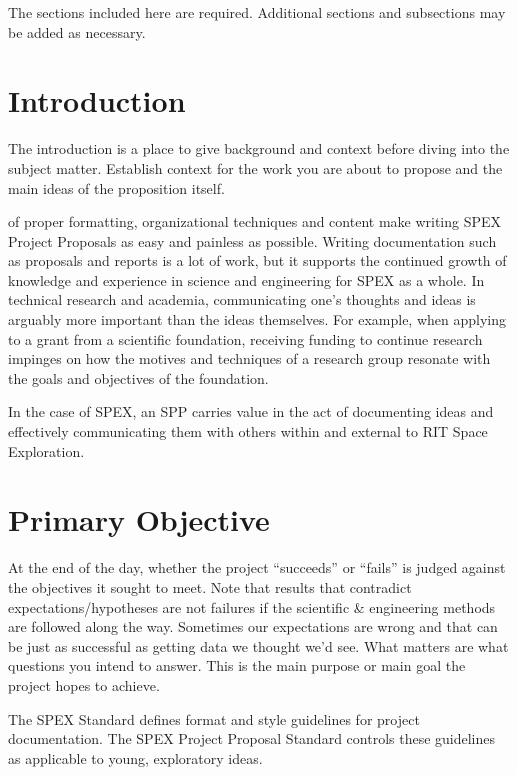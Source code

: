 \documentclass[journal]{SPEXformat}
\newenvironment{help}{
  \ttfamily\footnotesize\sloppy
  \begin{lrbox}{\helpbox}\begin{minipage}{\linewidth}
  }{
  \end{minipage}\end{lrbox}
  \ifbool{showhelp}{
    \fbox{\usebox{\helpbox}}
  }{}
}
\begin{document}
\printnomenclature{}
\begin{help}
  The sections included here are required. Additional sections and subsections may be added as necessary.
\end{help}
\section{Introduction}
\label{sec:introduction}
\begin{help}
  The introduction is a place to give background and context before diving into the subject matter.
  Establish context for the work you are about to propose and the main ideas of the proposition itself.
\end{help}

 of proper formatting, organizational techniques and content make writing SPEX Project Proposals as easy and painless as possible.
Writing documentation such as proposals and reports is a lot of work, but it supports the continued growth of knowledge and experience in science and engineering for SPEX as a whole.
In technical research and academia, communicating one's thoughts and ideas is arguably more important than the ideas themselves.
For example, when applying to a grant from a scientific foundation, receiving funding to continue research impinges on how the motives and techniques of a research group resonate with the goals and objectives of the foundation.

In the case of SPEX, an SPP carries value in the act of documenting ideas and effectively communicating them with others within and external to RIT Space Exploration.

\section{Primary Objective}
\label{sec:primary-obj}
\begin{help}
  At the end of the day, whether the project ``succeeds'' or ``fails'' is judged against the objectives it sought to meet.
  Note that results that contradict expectations/hypotheses are not failures if the scientific \& engineering methods are followed along the way.
  Sometimes our expectations are wrong and that can be just as successful as getting data we thought we'd see.
  What matters are what questions you intend to answer.
  This is the main purpose or main goal the project hopes to achieve.
\end{help}

The SPEX Standard defines format and style guidelines for project documentation. The SPEX Project Proposal Standard controls these guidelines as applicable to young, exploratory ideas.
\end{document}

